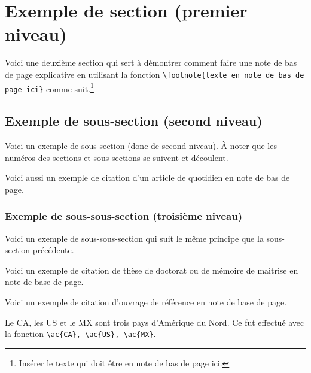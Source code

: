 \newpage
\section{Exemple de section (premier niveau)}

Voici une deuxième section qui sert à démontrer comment faire une note de bas de page explicative en utilisant la fonction \verb|\footnote{texte en note de bas de page ici}| comme suit.\footnote{Insérer le texte qui doit être en note de bas de page ici.}

\subsection{Exemple de sous-section (second niveau)}

Voici un exemple de sous-section (donc de second niveau). À noter que les numéros des sections et sous-sections se suivent et découlent.

Voici aussi un exemple de citation d'un article de quotidien en note de bas de page.\autocite{Quotidien2021}
    
\subsubsection{Exemple de sous-sous-section (troisième niveau)}

Voici un exemple de sous-sous-section qui suit le même principe que la sous-section précédente.

Voici un exemple de citation de thèse de doctorat ou de mémoire de maitrise en note de base de page. \autocite[50]{These2021}

Voici un exemple de citation d'ouvrage de référence en note de base de page.\autocite{References2021}

Le \ac{CA}, les \ac{US} et le \ac{MX} sont trois pays d'Amérique du Nord. Ce fut effectué avec la fonction \verb|\ac{CA}, \ac{US}, \ac{MX}|.